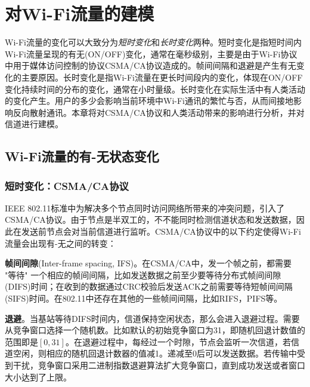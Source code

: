 
\chapter{对Wi-Fi流量的建模}
\label{chap:model}
Wi-Fi流量的变化可以大致分为\emph{短时变化}和\emph{长时变化}两种。短时变化是指短时间内Wi-Fi流量呈现的有无(ON/OFF)变化，通常在毫秒级别，主要是由于Wi-Fi协议中用于媒体访问控制的协议CSMA/CA协议造成的。帧间间隔和退避是产生有无变化的主要原因。长时变化是指Wi-Fi流量在更长时间段内的变化，体现在ON/OFF变化持续时间的分布的变化，通常在小时量级。长时变化在实际生活中有人类活动的变化产生。用户的多少会影响当前环境中Wi-Fi通讯的繁忙与否，从而间接地影响反向散射通讯。本章将对CSMA/CA协议和人类活动带来的影响进行分析，并对信道进行建模。
\section{Wi-Fi流量的有-无状态变化}
\subsection{短时变化：CSMA/CA协议}
IEEE 802.11标准中为解决多个节点同时访问网络所带来的冲突问题，引入了CSMA/CA协议。由于节点是半双工的，不不能同时检测信道状态和发送数据，因此在发送前节点会对当前信道进行监听。CSMA/CA协议中的以下约定使得Wi-Fi流量会出现有-无之间的转变：

\textbf{帧间间隙}(Inter-frame spacing, IFS)。在CSMA/CA中，发一个帧之前，都需要 "等待" 一个相应的帧间间隔，比如发送数据之前至少要等待分布式帧间间隙(DIFS)时间；在收到的数据通过CRC校验后发送ACK之前需要等待短帧间间隔(SIFS)时间。在802.11中还存在其他的一些帧间间隔，比如RIFS，PIFS等。

\textbf{退避}。当基站等待DIFS时间内，信道保持空闲状态，那么会进入退避过程。需要从竞争窗口选择一个随机数。比如默认的初始竞争窗口为31，即随机回退计数值的范围即是$[0,31]$。在退避过程中，每经过一个时隙，节点会监听一次信道，若信道空闲，则相应的随机回退计数器的值减1。递减至0后可以发送数据。若传输中受到干扰，竞争窗口采用二进制指数退避算法扩大竞争窗口，直到成功发送或者窗口大小达到了上限。

